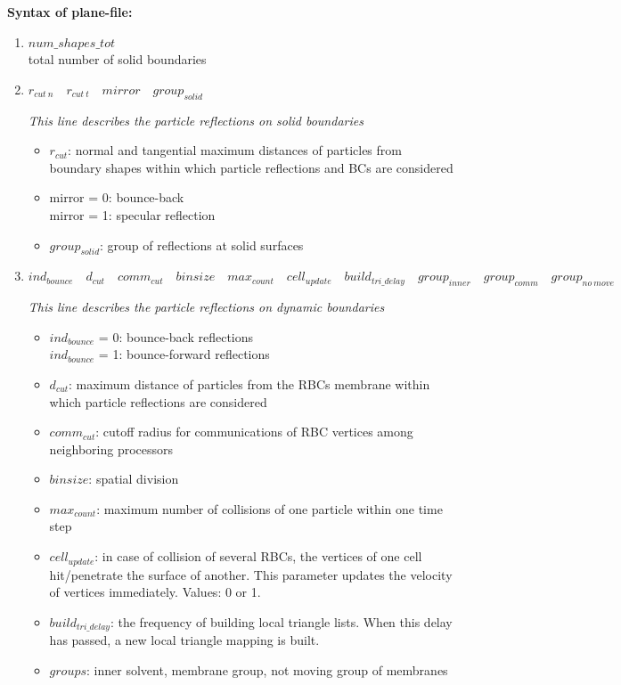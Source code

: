 \textbf{Syntax of plane-file:}
\begin{enumerate}
\item $ num\_shapes\_tot$\\
total number of solid boundaries

\item $  r_{cut\ n} \quad   r_{cut\ t} \quad   mirror \quad   group_{solid}$

	{\em This line describes the particle reflections on solid boundaries}
	\begin{itemize}
	\item $ r_{cut}$: normal and tangential maximum distances of particles from boundary shapes within which particle reflections and BCs are considered
	\item mirror = 0: bounce-back\\ mirror = 1: specular reflection
	\item $ group_{solid}$: group of reflections at solid surfaces
	\end{itemize}

\item $  ind_{bounce} \quad   d_{cut} \quad   comm_{cut} \quad   binsize \quad   max_{count} \quad   cell_{update} \quad build_{tri\_delay} \quad group_{inner} \quad   group_{comm} \quad   group_{no\ move}$	

	{\em This line describes the particle reflections on dynamic boundaries}
	\begin{itemize}
	\item $ ind_{bounce}$ = 0: bounce-back reflections\\ $ind_{bounce}$ = 1: bounce-forward reflections
	\item $ d_{cut}$: maximum distance of particles from the RBCs membrane within which particle reflections are considered
	\item $ comm_{cut}$: cutoff radius for communications of RBC vertices among neighboring processors
	\item $ binsize$: spatial division
	\item $ max_{count}$: maximum number of collisions of one particle within one time step
	\item $ cell_{update}$: in case of collision of several RBCs, the vertices of one cell hit/penetrate the surface of another. This parameter updates the velocity of vertices immediately. Values: 0 or 1.
        \item $build_{tri\_delay}$: the frequency of building local triangle lists. When this delay has passed, a new local triangle mapping is built. 
	\item $groups$: inner solvent, membrane group, not moving group of membranes
	\end{itemize}


\end{enumerate}
